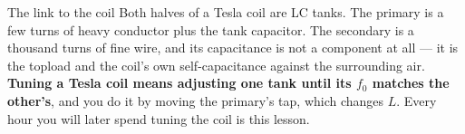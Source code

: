 \begin{telospanel}{The link to the coil}
Both halves of a Tesla coil are LC tanks. The primary is a few turns of heavy
conductor plus the tank capacitor. The secondary is a thousand turns of fine
wire, and its capacitance is not a component at all --- it is the topload and
the coil's own self-capacitance against the surrounding air. \textbf{Tuning a
Tesla coil means adjusting one tank until its $f_0$ matches the other's}, and
you do it by moving the primary's tap, which changes $L$. Every hour you will
later spend tuning the coil is this lesson.
\end{telospanel}
\lowvoltagenote

